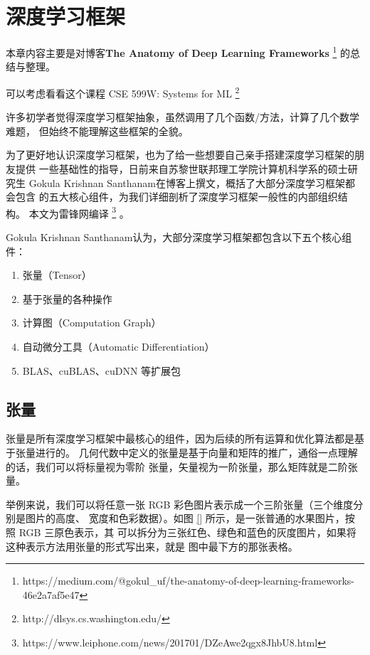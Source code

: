 \chapter{深度学习框架}\label{chap:framework}

\begin{intro}
本章内容主要是对博客\textbf{The Anatomy of Deep Learning Frameworks}%
\footnote{https://medium.com/@gokul\_uf/the-anatomy-of-deep-learning-frameworks-46e2a7af5e47}%
的总结与整理。

可以考虑看看这个课程 CSE 599W: Systems for ML%
\footnote{http://dlsys.cs.washington.edu/}%
\end{intro}

许多初学者觉得深度学习框架抽象，虽然调用了几个函数/方法，计算了几个数学难题，
但始终不能理解这些框架的全貌。

为了更好地认识深度学习框架，也为了给一些想要自己亲手搭建深度学习框架的朋友提供
一些基础性的指导，日前来自苏黎世联邦理工学院计算机科学系的硕士研究生
Gokula Krishnan Santhanam在博客上撰文，概括了大部分深度学习框架都会包含
的五大核心组件，为我们详细剖析了深度学习框架一般性的内部组织结构。%
本文为雷锋网编译%
\footnote{https://www.leiphone.com/news/201701/DZeAwe2qgx8JhbU8.html}%
。

Gokula Krishnan Santhanam认为，大部分深度学习框架都包含以下五个核心组件：
\begin{enumerate}
	\item 张量（Tensor）
	\item 基于张量的各种操作
	\item 计算图（Computation Graph）
	\item 自动微分工具（Automatic Differentiation）
	\item BLAS、cuBLAS、cuDNN 等扩展包
\end{enumerate}

\section{张量}\label{sec:tensor}

张量是所有深度学习框架中最核心的组件，因为后续的所有运算和优化算法都是基于张量进行的。
几何代数中定义的张量是基于向量和矩阵的推广，通俗一点理解的话，我们可以将标量视为零阶
张量，矢量视为一阶张量，那么矩阵就是二阶张量。

举例来说，我们可以将任意一张 RGB 彩色图片表示成一个三阶张量（三个维度分别是图片的高度、
宽度和色彩数据）。如图 \ref{} 所示，是一张普通的水果图片，按照 RGB 三原色表示，其
可以拆分为三张红色、绿色和蓝色的灰度图片，如果将这种表示方法用张量的形式写出来，就是
图中最下方的那张表格。

